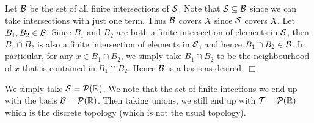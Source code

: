 \documentclass{article}
\begin{document}
 {
    \begin{spacedenumerate}
        \item Let $\mathcal{B}$ be the set of all finite intersections of $\mathcal{S}$. Note that $\mathcal{S}\subseteq\mathcal{B}$ since we can take intersections with just one term. Thus $\mathcal{B}$ covers $X$ since $\mathcal{S}$ covers $X$. Let $B_{1},B_{2}\in \mathcal{B}$. Since $B_{1}$ and $B_{2}$ are both a finite intersection of elements in $\mathcal{S}$, then $B_{1}\cap B_{2}$ is also a finite intersection of elements in $\mathcal{S}$, and hence $B_{1}\cap B_{2} \in \mathcal{B}$. In particular, for any $x\in B_{1}\cap B_{2}$, we simply take $B_{1}\cap B_{2}$ to be the neighbourhood of $x$ that is contained in $B_{1}\cap B_{2}$. Hence $\mathcal{B}$ is a basis as desired. $\Box$
        \item We simply take $\mathcal{S} = \mathcal{P}(\mathbb{R})$. We note that the set of finite intections we end up with the basis $\mathcal{B} = \mathcal{P}(\mathbb{R})$. Then taking unions, we still end up with $\mathcal{T} = \mathcal{P}(\mathbb{R})$ which is the discrete topology (which is not the usual topology).
    \end{spacedenumerate}
}
\end{document}
